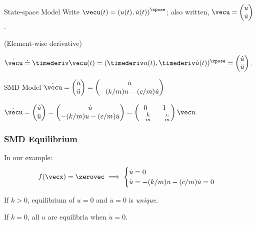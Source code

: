 \documentclass[12pt]{beamer}
\begin{document}
\begin{frame}
\begin{block}{State-space Model}
Write
$\vecu(t) = \left( u(t), \dot u(t) \right)^\xpose$;
also written, 
$\vecu = \begin{pmatrix} u \\ \dot u \end{pmatrix}$.

(Element-wise derivative)

$\dot\vecu
	\doteq \timederiv \vecu(t)
	= ( \timederiv u(t), \timederiv \dot u(t) )^\xpose
	= \begin{pmatrix}
		\dot u \\
		\ddot u
	\end{pmatrix}$.

\end{block}

\begin{block}{SMD Model}
$\dot \vecu
	= \begin{pmatrix} \dot u \\ \ddot u \end{pmatrix}
	= \begin{pmatrix}
		\dot u \\
		-(k/m) u - (c/m) \dot u
		\end{pmatrix}$
		
$\dot \vecu
	= \begin{pmatrix} \dot u \\ \ddot u \end{pmatrix}
	= \begin{pmatrix}
		\dot u \\
		-(k/m) u - (c/m) \dot u
		\end{pmatrix}
	= \begin{pmatrix} 0 & 1 \\ -\frac{k}{m} & -\frac{c}{m} \end{pmatrix}
	\vecu$.
	
\end{block}

\end{frame}


\begin{frame}
\frametitle{SMD Equilibrium}

\begin{itemize}
\vitem In our example:
\[
f(\vecx) = \zerovec \implies
\begin{cases}
	\dot u = 0	\\
	\ddot u = -(k/m) u - (c/m) \dot u = 0
\end{cases}
\]

\vitem If $k > 0$, equilibrium of $u = 0$ and $\dot u = 0$ is \emph{unique}.

\vitem If $k = 0$, all $u$ are equilibria when $\dot u = 0$.
\end{itemize}
\end{frame}
\end{document}
